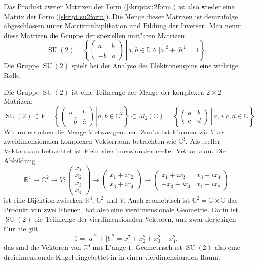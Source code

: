 Das Produkt zweier Matrizen der Form (\ref{skript:su2form}) ist also wieder eine
Matrix der Form (\ref{skript:su2form}).
Die Menge dieser Matrizen ist demzufolge abgeschlossen unter
Matrixmultiplikation und Bildung der Inversen.
Man nennt diese Matrizen die Gruppe der speziellen unit"aren Matrizen:
\[
\operatorname{SU}(2)=\left\{
\left.
\begin{pmatrix}
a&b\\-\bar b&\bar a
\end{pmatrix}
\,
\right|
\,
a,b\in\mathbb C\wedge
|a|^2+|b|^2=1
\right\}.
\]
Die Gruppe $\operatorname{SU}(2)$ spielt bei der Analyse des Elektronenspins
eine wichtige Rolle.

Die Gruppe $\operatorname{SU}(2)$ ist eine Teilmenge der Menge der komplexen
$2\times 2$-Matrizen:
\[
\operatorname{SU}(2)
\subset
V=
\left\{
\left.
\begin{pmatrix}a&b\\-\bar b&\bar a\end{pmatrix}\,
\right|
a,b\in\mathbb C^2
\right\}
\subset
M_2(\mathbb C)
=\left\{
\left.
\begin{pmatrix}
a&b\\c&d
\end{pmatrix}
\,
\right|
\, a,b,c,d\in\mathbb C
\right\}
\]
Wir untersuchen die Menge $V$ etwas genauer.
Zun"achst k"onnen wir $V$ als zweidimensionalen komplexen Vektorraum
betrachten wie $\mathbb C^2$.
Als reeller Vektorraum betrachtet ist $V$ ein vierdimensionaler
reeller Vektorraum. Die Abbildung
\[
\mathbb R^4\to\mathbb C^2\to V
:
\begin{pmatrix}x_1\\x_2\\x_3\\x_4\end{pmatrix}\mapsto
\begin{pmatrix}x_1+ix_2\\x_3+ix_4\end{pmatrix}\mapsto
\begin{pmatrix} x_1+ix_2 & x_3+ix_4 \\
               -x_3+ix_4 & x_1-ix_2 \end{pmatrix}
\]
ist eine Bijektion zwischen $\mathbb R^4$, $\mathbb C^2$ und $V$.
Auch geometrisch ist $\mathbb C^2=\mathbb C\times \mathbb C$ das Produkt
von zwei Ebenen, hat also eine vierdimensionale Geometrie.
Darin ist $\operatorname{SU}(2)$ die Teilmenge der vierdimensionalen Vektoren,
und zwar derjenigen f"ur die gilt
\[
1
=
|a|^2+|b|^2
= 
x_1^2 + x_2^2 + x_3^2 + x_4^2,
\]
das sind die Vektoren von $\mathbb R^4$ mit L"ange $1$.
Geometrisch ist $\operatorname{SU}(2)$ also eine dreidimensionale Kugel
eingebettet in in einen vierdimensionalen Raum.

